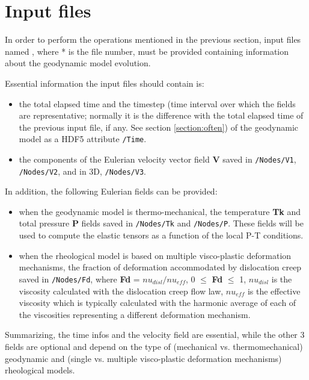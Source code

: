 \section{Input \vtptitle{} files}
In order to perform the operations mentioned in the previous section, input files named \vtptitle{}, where * is the file number, must be provided containing information about the geodynamic model evolution.

Essential information the input \vtptitle{} files should contain is:
\begin{itemize}
    \item the total elapsed time  and the timestep  (time interval over which the fields are representative; normally it is the difference with the total elapsed time of the previous input \vtptitle{} file, if any. See section \ref{section:often}) of the geodynamic model as a HDF5 attribute \texttt{/Time}.
    \item the components of the Eulerian velocity vector field \textbf{V} saved in \texttt{/Nodes/V1}, \texttt{/Nodes/V2}, and in 3D, \texttt{/Nodes/V3}.
\end{itemize}

In addition, the following Eulerian fields can be provided:
\begin{itemize}
    \item when the geodynamic model is thermo-mechanical, the temperature \textbf{Tk} and total pressure \textbf{P} fields saved in \texttt{/Nodes/Tk} and \texttt{/Nodes/P}. These fields will be used to compute the elastic tensors as a function of the local P-T conditions.
    \item when the rheological model is based on multiple visco-plastic deformation mechanisms, the fraction of deformation accommodated by dislocation creep saved in \texttt{/Nodes/Fd}, where \textbf{Fd} = $nu_{disl}/nu_{eff}$, 0 $\leq$ \textbf{Fd} $\leq$ 1, $nu_{disl}$ is the viscosity calculated with the dislocation creep flow law, $nu_{eff}$ is the effective viscosity which is typically calculated with the harmonic average of each of the viscosities representing a different deformation mechanism. 
\end{itemize}

Summarizing, the time infos and the velocity field are essential, while the other 3 fields are optional and depend on the type of (mechanical vs. thermomechanical) geodynamic and (single vs. multiple visco-plastic deformation mechanisms) rheological models.

